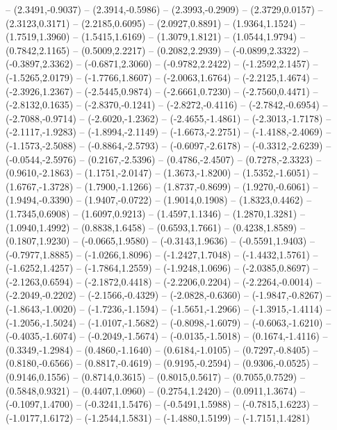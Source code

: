 {	-- (2.3491,-0.9037)
	-- (2.3914,-0.5986)
	-- (2.3993,-0.2909)
	-- (2.3729,0.0157)
	-- (2.3123,0.3171)
	-- (2.2185,0.6095)
	-- (2.0927,0.8891)
	-- (1.9364,1.1524)
	-- (1.7519,1.3960)
	-- (1.5415,1.6169)
	-- (1.3079,1.8121)
	-- (1.0544,1.9794)
	-- (0.7842,2.1165)
	-- (0.5009,2.2217)
	-- (0.2082,2.2939)
	-- (-0.0899,2.3322)
	-- (-0.3897,2.3362)
	-- (-0.6871,2.3060)
	-- (-0.9782,2.2422)
	-- (-1.2592,2.1457)
	-- (-1.5265,2.0179)
	-- (-1.7766,1.8607)
	-- (-2.0063,1.6764)
	-- (-2.2125,1.4674)
	-- (-2.3926,1.2367)
	-- (-2.5445,0.9874)
	-- (-2.6661,0.7230)
	-- (-2.7560,0.4471)
	-- (-2.8132,0.1635)
	-- (-2.8370,-0.1241)
	-- (-2.8272,-0.4116)
	-- (-2.7842,-0.6954)
	-- (-2.7088,-0.9714)
	-- (-2.6020,-1.2362)
	-- (-2.4655,-1.4861)
	-- (-2.3013,-1.7178)
	-- (-2.1117,-1.9283)
	-- (-1.8994,-2.1149)
	-- (-1.6673,-2.2751)
	-- (-1.4188,-2.4069)
	-- (-1.1573,-2.5088)
	-- (-0.8864,-2.5793)
	-- (-0.6097,-2.6178)
	-- (-0.3312,-2.6239)
	-- (-0.0544,-2.5976)
	-- (0.2167,-2.5396)
	-- (0.4786,-2.4507)
	-- (0.7278,-2.3323)
	-- (0.9610,-2.1863)
	-- (1.1751,-2.0147)
	-- (1.3673,-1.8200)
	-- (1.5352,-1.6051)
	-- (1.6767,-1.3728)
	-- (1.7900,-1.1266)
	-- (1.8737,-0.8699)
	-- (1.9270,-0.6061)
	-- (1.9494,-0.3390)
	-- (1.9407,-0.0722)
	-- (1.9014,0.1908)
	-- (1.8323,0.4462)
	-- (1.7345,0.6908)
	-- (1.6097,0.9213)
	-- (1.4597,1.1346)
	-- (1.2870,1.3281)
	-- (1.0940,1.4992)
	-- (0.8838,1.6458)
	-- (0.6593,1.7661)
	-- (0.4238,1.8589)
	-- (0.1807,1.9230)
	-- (-0.0665,1.9580)
	-- (-0.3143,1.9636)
	-- (-0.5591,1.9403)
	-- (-0.7977,1.8885)
	-- (-1.0266,1.8096)
	-- (-1.2427,1.7048)
	-- (-1.4432,1.5761)
	-- (-1.6252,1.4257)
	-- (-1.7864,1.2559)
	-- (-1.9248,1.0696)
	-- (-2.0385,0.8697)
	-- (-2.1263,0.6594)
	-- (-2.1872,0.4418)
	-- (-2.2206,0.2204)
	-- (-2.2264,-0.0014)
	-- (-2.2049,-0.2202)
	-- (-2.1566,-0.4329)
	-- (-2.0828,-0.6360)
	-- (-1.9847,-0.8267)
	-- (-1.8643,-1.0020)
	-- (-1.7236,-1.1594)
	-- (-1.5651,-1.2966)
	-- (-1.3915,-1.4114)
	-- (-1.2056,-1.5024)
	-- (-1.0107,-1.5682)
	-- (-0.8098,-1.6079)
	-- (-0.6063,-1.6210)
	-- (-0.4035,-1.6074)
	-- (-0.2049,-1.5674)
	-- (-0.0135,-1.5018)
	-- (0.1674,-1.4116)
	-- (0.3349,-1.2984)
	-- (0.4860,-1.1640)
	-- (0.6184,-1.0105)
	-- (0.7297,-0.8405)
	-- (0.8180,-0.6566)
	-- (0.8817,-0.4619)
	-- (0.9195,-0.2594)
	-- (0.9306,-0.0525)
	-- (0.9146,0.1556)
	-- (0.8714,0.3615)
	-- (0.8015,0.5617)
	-- (0.7055,0.7529)
	-- (0.5848,0.9321)
	-- (0.4407,1.0960)
	-- (0.2754,1.2420)
	-- (0.0911,1.3674)
	-- (-0.1097,1.4700)
	-- (-0.3241,1.5476)
	-- (-0.5491,1.5988)
	-- (-0.7815,1.6223)
	-- (-1.0177,1.6172)
	-- (-1.2544,1.5831)
	-- (-1.4880,1.5199)
	-- (-1.7151,1.4281)
}
